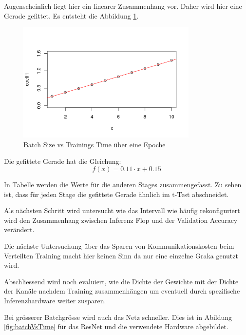 Augenscheinlich liegt hier ein linearer Zusammenhang vor. Daher wird hier eine Gerade gefittet.
Es entsteht die Abbildung \ref{fig:gerade}.

\begin{figure}[h]
 \centering
 \includegraphics[width=0.8\textwidth]{KapitelPartB/Images/gerade.png}
 \caption{Batch Size vs Trainings Time über eine Epoche}
 \label{fig:gerade}
\end{figure}




Die gefittete Gerade hat die Gleichung: $$ f(x)=0.11 \cdot x +  0.15 $$


In Tabelle  werden die Werte für die anderen Stages zusammengefasst. Zu sehen ist, dass für jeden Stage die gefittete Gerade ähnlich im t-Test abschneidet.







Als nächsten Schritt wird untersucht wie das Intervall wie häufig rekonfiguriert wird den Zusammenhang zwischen Inferenz Flop und der Validation Accuracy verändert.


Die nächste Untersuchung über das Sparen von Kommunikationskosten beim Verteilten Training macht hier keinen Sinn da nur eine einzelne Graka genutzt wird.


Abschliessend wird noch evaluiert, wie die Dichte der Gewichte mit der Dichte der Kanäle nachdem Training zusammenhängen um eventuell durch spezifische Inferenzhardware weiter zusparen.





Bei grösserer Batchgrösse wird auch das Netz schneller. Dies ist in Abildung \ref{fig:batchVsTime} für das ResNet und die verwendete Hardware abgebildet.

